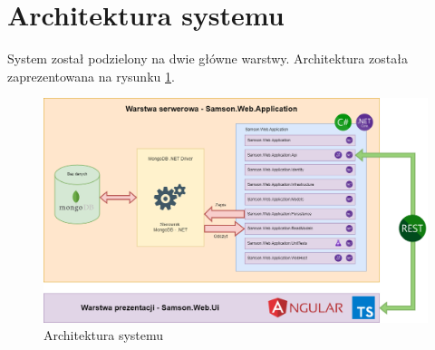 \documentclass[a4paper,twoside,12pt]{book}
\begin{document}
{\section{Architektura systemu}
System został podzielony na dwie główne warstwy. Architektura została zaprezentowana na rysunku \ref{fig:architektura}.
\begin{figure}[htbp]
	\centering
	\includegraphics[width=1\linewidth]{../diagramy/architektura}
	\caption{Architektura systemu}
	\label{fig:architektura}
\end{figure}

}
\end{document}
